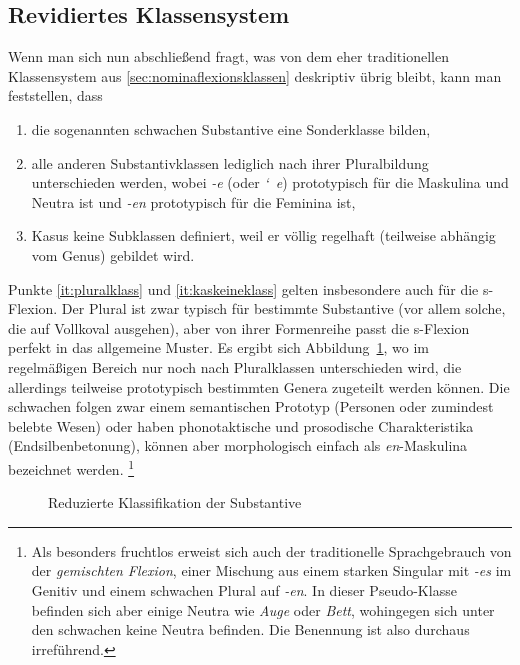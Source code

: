 \subsection{Revidiertes Klassensystem}

\label{sec:neuenklassen}


Wenn man sich nun abschließend fragt, was von dem eher traditionellen Klassensystem aus \ref{sec:nominaflexionsklassen} deskriptiv übrig bleibt, kann man feststellen, dass

\begin{enumerate}\Lf
  \item die sogenannten schwachen Substantive eine Sonderklasse bilden,
  \item\label{it:pluralklass} alle anderen Substantivklassen lediglich nach ihrer Pluralbildung unterschieden werden, wobei \textit{-e} (oder \textit{\char`~e}) prototypisch für die Maskulina und Neutra ist und \textit{-en} prototypisch für die Feminina ist,
  \item\label{it:kaskeineklass} Kasus keine Subklassen definiert, weil er völlig regelhaft (teilweise abhängig vom Genus) gebildet wird.
\end{enumerate}

Punkte \ref{it:pluralklass} und \ref{it:kaskeineklass} gelten insbesondere auch für die s-Flexion.
Der Plural ist zwar typisch für bestimmte Substantive (vor allem solche, die auf Vollkoval ausgehen), aber von ihrer Formenreihe passt die s-Flexion perfekt in das allgemeine Muster.
Es ergibt sich Abbildung~\ref{fig:neuenklassen}, wo im regelmäßigen Bereich nur noch nach Pluralklassen unterschieden wird, die allerdings teilweise prototypisch bestimmten Genera zugeteilt werden können.
Die schwachen folgen zwar einem semantischen Prototyp (Personen oder zumindest belebte Wesen) oder haben phonotaktische und prosodische Charakteristika (\zB Endsilbenbetonung), können aber morphologisch einfach als \textit{en}-Maskulina bezeichnet werden.%
\footnote{Als besonders fruchtlos erweist sich auch der traditionelle Sprachgebrauch von der \textit{gemischten Flexion}, einer Mischung aus einem starken Singular mit \textit{-es} im Genitiv und einem schwachen Plural auf \textit{-en}.
In dieser Pseudo-Klasse befinden sich aber einige Neutra wie \textit{Auge} oder \textit{Bett}, wohingegen sich unter den schwachen keine Neutra befinden.
Die Benennung ist also durchaus irreführend.}

\begin{figure}[!htbp]
  \centering
  \caption{Reduzierte Klassifikation der Substantive}
  \label{fig:neuenklassen}
\end{figure}

